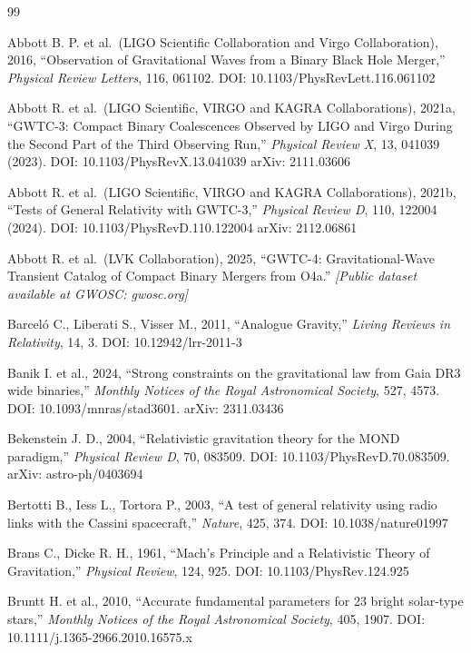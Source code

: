 \documentclass[10pt,a4paper]{article}
\begin{document}
\begin{thebibliography}{99}

Abbott B. P. et al.~(LIGO Scientific Collaboration and Virgo Collaboration), 2016, ``Observation of Gravitational Waves from a Binary Black Hole Merger,'' \emph{Physical Review Letters}, 116, 061102. DOI: 10.1103/PhysRevLett.116.061102

Abbott R. et al.~(LIGO Scientific, VIRGO and KAGRA Collaborations), 2021a, ``GWTC-3: Compact Binary Coalescences Observed by LIGO and Virgo During the Second Part of the Third Observing Run,'' \emph{Physical Review X}, 13, 041039 (2023). DOI: 10.1103/PhysRevX.13.041039 arXiv: 2111.03606

Abbott R. et al.~(LIGO Scientific, VIRGO and KAGRA Collaborations), 2021b, ``Tests of General Relativity with GWTC-3,'' \emph{Physical Review D}, 110, 122004 (2024). DOI: 10.1103/PhysRevD.110.122004 arXiv: 2112.06861

Abbott R. et al.~(LVK Collaboration), 2025, ``GWTC-4: Gravitational-Wave Transient Catalog of Compact Binary Mergers from O4a.'' \emph{{[}Public dataset available at GWOSC: gwosc.org{]}}

Barceló C., Liberati S., Visser M., 2011, ``Analogue Gravity,'' \emph{Living Reviews in Relativity}, 14, 3. DOI: 10.12942/lrr-2011-3

Banik I. et al., 2024, ``Strong constraints on the gravitational law from Gaia DR3 wide binaries,'' \emph{Monthly Notices of the Royal Astronomical Society}, 527, 4573. DOI: 10.1093/mnras/stad3601. arXiv: 2311.03436

Bekenstein J. D., 2004, ``Relativistic gravitation theory for the MOND paradigm,'' \emph{Physical Review D}, 70, 083509. DOI: 10.1103/PhysRevD.70.083509. arXiv: astro-ph/0403694

Bertotti B., Iess L., Tortora P., 2003, ``A test of general relativity using radio links with the Cassini spacecraft,'' \emph{Nature}, 425, 374. DOI: 10.1038/nature01997

Brans C., Dicke R. H., 1961, ``Mach's Principle and a Relativistic Theory of Gravitation,'' \emph{Physical Review}, 124, 925. DOI: 10.1103/PhysRev.124.925

Bruntt H. et al., 2010, ``Accurate fundamental parameters for 23 bright solar-type stars,'' \emph{Monthly Notices of the Royal Astronomical Society}, 405, 1907. DOI: 10.1111/j.1365-2966.2010.16575.x


\end{thebibliography}
\end{document}
